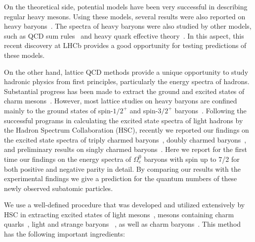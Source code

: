 \documentclass[showkeys,aps,twocolumn,showpacs,preprintnumbers,amsmath,amssymb,prd,letterpaper,floatfix,nofootinbib,superscriptaddress,]{revtex4-1}
\begin{document}
On the theoretical side, potential models have been very successful in
describing regular heavy mesons. 
Using these models, several results were also reported
on heavy
baryons~\cite{Ebert:2007nw,Ebert:2011kk,Garcilazo:2007eh,Valcarce:2008dr,Roberts:2007ni,Vijande:2012mk,Yoshida:2015tia,Shah:2016nxi}.
The spectra of heavy baryons were also studied by other models, such as
QCD sum rules~\cite{Bagan:1992tp,Huang:2000tn,Wang:2009cr,Chen:2015kpa} 
and heavy
quark effective theory~\cite{Chiladze:1997ev}.  In this aspect, this
recent discovery at LHCb provides a good opportunity for testing
predictions of these models.

On the other hand, lattice QCD methods provide a unique opportunity to
study hadronic physics from first principles, particularly the energy
spectra of hadrons. Substantial progress has been made to extract the
ground and excited states of charm
mesons~\cite{Dudek:2007wv,Liu:2012ze,Moir:2013ub}.  However, most
lattice studies on heavy baryons are confined mainly to the ground
states of spin-$1/2^+$ and spin-$3/2^+$
baryons~\cite{Mathur:2002ce,Lewis:2001iz,Durr:2012dw,
  Basak:2012py,Basak:2013oya,Namekawa:2013vu,Brown:2014ena,Bali:2015lka}.
Following the successful programs in calculating the excited state
spectra of light hadrons by the Hadron Spectrum
Collaboration (HSC), recently we reported our findings on the
excited state spectra of triply charmed baryons~\cite{Padmanath:2013zfa},
doubly charmed baryons~\cite{Padmanath:2015jea}, and preliminary
results on singly charmed
baryons~\cite{Padmanath:2013bla,Padmanath:2014bxa,Padmanath:2015bra}.  Here we report
for the first time our findings on the energy spectra of $\Omega_c^0$
baryons with spin up to 7/2 for both positive and negative parity in
detail.
 By comparing our results with the experimental findings we give a
 prediction for the quantum numbers of these newly observed
 subatomic particles.

We use a well-defined procedure that was developed and utilized extensively by
HSC in extracting excited states of light mesons~\cite{Dudek:2009qf,Dudek:2010wm,Dudek:2010ew}, mesons containing charm
quarks~\cite{Dudek:2007wv,Liu:2012ze,Moir:2013ub}, light and strange baryons
~\cite{Edwards:2011jj, Edwards:2012fx}, as well as charm
baryons~\cite{Padmanath:2013zfa,Padmanath:2015jea,Padmanath:2013bla,Padmanath:2014bxa}. This method has the following important ingredients:
\end{document}
